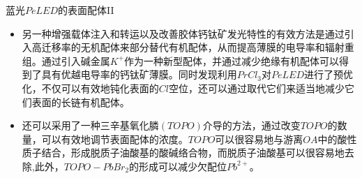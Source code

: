 \documentclass{beamer}[fontset=windows]
\begin{document}
\begin{frame}
\begin{block}{蓝光$PeLED$的表面配体II}
\begin{itemize}
\item 另一种增强载体注入和转运以及改善胶体钙钛矿发光特性的有效方法是通过引入高迁移率的无机配体来部分替代有机配体，从而提高薄膜的电导率和辐射重组。通过引入碱金属$K^{+}$作为一种新型配体，并通过减少绝缘有机配体可以得到了具有优越电导率的钙钛矿薄膜。同时发现利用$PrCl_{3}$对$PeLED$进行了预优化，不仅可以有效地钝化表面的$Cl$空位，还可以通过取代它们来适当地减少它们表面的长链有机配体。
\item 还可以采用了一种三辛基氧化膦$(TOPO)$介导的方法，通过改变$TOPO$的数量，可以有效地调节表面配体的浓度。$TOPO$可以很容易地与游离$OA$中的酸性质子结合，形成脱质子油酸基的酸碱络合物，而脱质子油酸基可以很容易地去除,此外，$TOPO-PbBr_{2}$的形成可以减少欠配位$Pb^{2+}$。
\end{itemize}
\end{block}
\end{frame}
\end{document}
